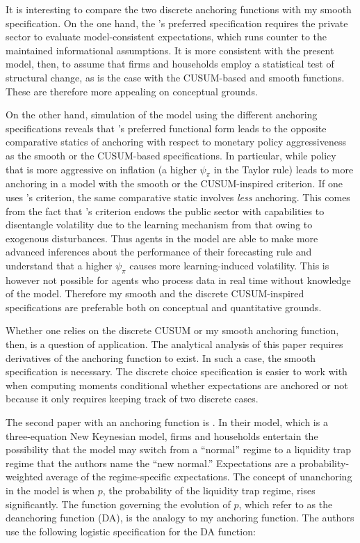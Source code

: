 \documentclass[11pt]{article}
\renewcommand{\[}{\begin{equation}}
\renewcommand{\]}{\end{equation}}
\begin{document}
It is interesting to compare the two discrete anchoring functions with my smooth specification. On the one hand, the \cite{carvalho2019anchored}'s preferred specification requires the private sector to evaluate model-consistent expectations, which runs counter to the maintained informational assumptions. It is more consistent with the present model, then, to assume that firms and households employ a statistical test of structural change, as is the case with the CUSUM-based and smooth functions. These are therefore more appealing on conceptual grounds.

On the other hand, simulation of the model using the different anchoring specifications reveals that \cite{carvalho2019anchored}'s preferred functional form leads to the opposite comparative statics of anchoring with respect to monetary policy aggressiveness as the smooth or the CUSUM-based specifications. In particular, while policy that is more aggressive on inflation (a higher $\psi_{\pi}$ in the Taylor rule) leads to more anchoring in a model with the smooth or the CUSUM-inspired criterion. If one uses \cite{carvalho2019anchored}'s criterion, the same comparative static involves \emph{less} anchoring. This comes from the fact that \cite{carvalho2019anchored}'s criterion endows the public sector with capabilities to disentangle volatility due to the learning mechanism from that owing to exogenous disturbances. Thus agents in the \cite{carvalho2019anchored} model are able to make more advanced inferences about the performance of their forecasting rule and understand that a higher $\psi_{\pi}$ causes more learning-induced volatility. This is however not possible for agents who process data in real time without knowledge of the model. Therefore my smooth and the discrete CUSUM-inspired specifications are preferable both on conceptual and quantitative grounds.

Whether one relies on the discrete CUSUM or my smooth anchoring function, then, is a question of application. The analytical analysis of this paper requires derivatives of the anchoring function to exist. In such a case, the smooth specification is necessary. The discrete choice specification is easier to work with when computing moments conditional whether expectations are anchored or not because it only requires keeping track of two discrete cases.

The second paper with an anchoring function is \cite{gobbi2019monetary}. In their model, which is a three-equation New Keynesian model, firms and households entertain the possibility that the model may switch from a ``normal'' regime to a liquidity trap regime that the authors name the ``new normal.'' Expectations are a probability-weighted average of the regime-specific expectations. The concept of unanchoring in the model is when $p$, the probability of the liquidity trap regime, rises significantly. The function governing the evolution of $p$, which \cite{gobbi2019monetary} refer to as the deanchoring function (DA), is the analogy to my anchoring function. The authors use the following logistic specification for the DA function:
\end{document}
